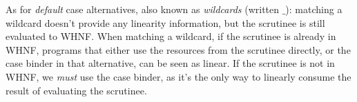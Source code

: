 \documentclass[acmsmall,review,screen]{acmart}
\begin{document}


As for \emph{default} case alternatives, also known as \emph{wildcards}
(written $\_$): matching a wildcard doesn't provide any linearity information,
%
but the
scrutinee is still evaluated to WHNF.
%
%
When matching a wildcard, if the scrutinee is already in WHNF,
programs that either use the resources from the scrutinee directly, or the case
binder in that alternative, can be seen as linear. If the scrutinee is not in
WHNF, we \emph{must} use the case binder, as it's the only way to linearly
consume the result of evaluating the scrutinee.
\end{document}
